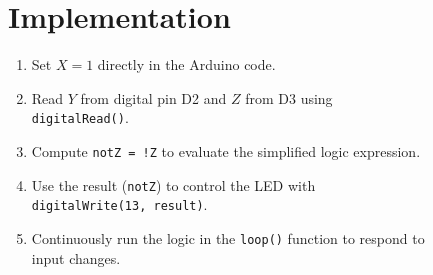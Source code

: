 \documentclass[12pt,a4paper]{article}
\begin{document}
\begin{figure}[H]
  \centering
  \begin{minipage}[t]{0.48\textwidth}
    \section*{Implementation}
    \small
    \begin{enumerate}[left=0pt]
      \item Set $X = 1$ directly in the Arduino code.
      \item Read $Y$ from digital pin D2 and $Z$ from D3 using \texttt{digitalRead()}.
      \item Compute \texttt{notZ = !Z} to evaluate the simplified logic expression.
      \item Use the result (\texttt{notZ}) to control the LED with \texttt{digitalWrite(13, result)}.
      \item Continuously run the logic in the \texttt{loop()} function to respond to input changes.
    \end{enumerate}
  \end{minipage}\hfill
  \begin{minipage}[t]{0.48\textwidth}
  \end{minipage}
\end{figure}
\end{document}
